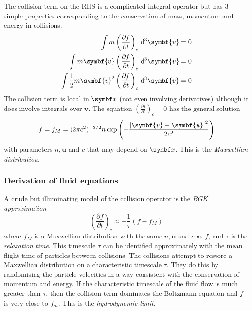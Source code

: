 \documentclass{jknotes}
\begin{document}
The collision term on the RHS is a complicated integral operator but has 3
simple properties corresponding to the conservation of mass, momentum and
energy in collisions.
\begin{align}
	\int m \left( \frac{\partial f}{\partial t}\right)_c \, \diffd^3 \symbf{v}
	&= 0 \\
	\int m \symbf{v}\left( \frac{\partial f}{\partial t}\right)_c \, \diffd^3 \symbf{v}
	&= 0 \\
	\int \frac{1}{2}m\symbf{v}^2 \left( \frac{\partial f}{\partial t}\right)_c \, \diffd^3 \symbf{v}
	&= 0
\end{align}
The collision term is local in $\x$ (not even involving derivatives) although
it does involve integrals over $\symbf{v}$. The equation $\left(\frac{\partial
f}{\partial t}\right)_c = 0$ has the general solution
\begin{equation}
	f = f_M = (2\pi c^2)^{-3/2} n \exp\left( -
	\frac{\abs{\symbf{v}-\symbf{u}}^2}{2c^2}\right)
\end{equation}
with parameters $n, \symbf{u}$ and $c$ that may depend on $\x$. This is the
\emph{Maxwellian distribution}. 

\subsubsection{Derivation of fluid equations}
A crude but illuminating model of the collision operator is the \emph{BGK
approximation}
\begin{equation}
	\left( \frac{\partial f}{\partial t}\right)_c \approx - \frac{1}{\tau}
	(f-f_M)
\end{equation}
where $f_M$ is a Maxwellian distribution with the same $n, \symbf{u}$ and $c$
as $f$, and $\tau$ is the \emph{relaxation time}. This timescale $\tau$ can be
identified approximately with the mean flight time of particles between
collisions. The collisions attempt to restore a Maxwellian distribution on a
characteristic timescale $\tau$. They do this by randomising the particle
velocities in a way consistent with the conservation of momentum and energy.
If the characteristic timescale of the fluid flow is much greater than $\tau$,
then the collision term dominates the Boltzmann equation and $f$ is very close
to $f_m$. This is the \emph{hydrodynamic limit}. 
\end{document}
